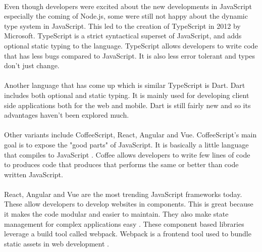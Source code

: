 \paragraph{}
Even though developers were excited about the new developments in JavaScript especially the coming of Node.js, some were still not happy about the dynamic type system in JavaScript. This led to the creation of TypeScript in 2012 by Microsoft. TypeScript is a strict syntactical superset of JavaScript, and adds optional static typing to the language. TypeScript allows developers to write code that has less bugs compared to JavaScript. It is also less error tolerant and types don't just change.
\paragraph{}
Another language that has come up which is similar TypeScript is Dart. Dart includes both optional and static typing. It is mainly used for developing client side applications both for the web and mobile. Dart is still fairly new and so its advantages haven't been explored much.
\paragraph{}
Other variants include CoffeeScript, React, Angular and Vue. CoffeeScript's main goal is to expose the "good parts" of JavaScript. It is basically a little language that compiles to JavaScript \cite{coffee}. Coffee allows developers to write few lines of code to produces code that produces that performs the same or better than code written JavaScript.
\paragraph{}
React, Angular and Vue are the most trending JavaScript frameworks today. These allow developers to develop websites in components. This is great because it makes the code modular and easier to maintain. They also make state management for complex applications easy \cite{react}. These component based libraries leverage a build tool called webpack. Webpack is a frontend tool used to bundle static assets in web development \cite{webpack}.